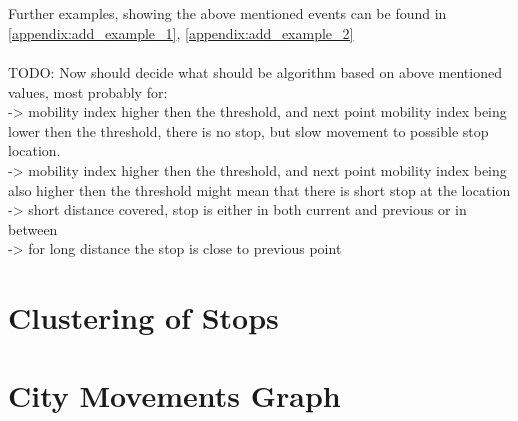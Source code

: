 \\\\
Further examples, showing the above mentioned events can be found in \autoref{appendix:add_example_1}, \autoref{appendix:add_example_2}
\\\\
TODO: Now should decide what should be algorithm based on above mentioned values, most probably for:
\\-> mobility index higher then the threshold, and next point mobility index being lower then the threshold, there is no stop, but slow movement to possible stop location. 
\\-> mobility index higher then the threshold, and next point mobility index being also higher then the threshold might mean that there is short stop at the location
\\-> short distance covered, stop is either in both current and previous or in between
\\-> for long distance the stop is close to previous point

\section{Clustering of Stops}

\FloatBarrier
\section{City Movements Graph}

\FloatBarrier